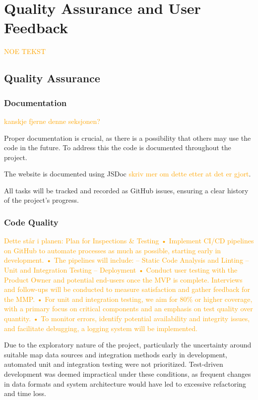 \chapter{Quality Assurance and User Feedback}\label{chap:qualityassuranceanduserfeedback}

\textcolor{orange}{NOE TEKST}

\section{Quality Assurance}

\subsection{Documentation}
\textcolor{orange}{kanskje fjerne denne seksjonen?}

Proper documentation is crucial, as there is a possibility that others may use the code in the
future. To address this the code is documented throughout the project. 

The website is documented using JSDoc \textcolor{orange}{skriv mer om dette etter at det er gjort}.  


All tasks will be tracked and recorded as GitHub issues, ensuring a clear
history of the project's progress. 

\subsection{Code Quality} %

\textcolor{orange}{Dette står i planen: Plan for Inspections & Testing
• Implement CI/CD pipelines on GitHub to automate processes as much as possible, starting
early in development.
• The pipelines will include:
– Static Code Analysis and Linting
– Unit and Integration Testing
– Deployment
• Conduct user testing with the Product Owner and potential end-users once the MVP is
complete. Interviews and follow-ups will be conducted to measure satisfaction and gather
feedback for the MMP.
• For unit and integration testing, we aim for 80\% or higher coverage, with a primary focus on
critical components and an emphasis on test quality over quantity.
• To monitor errors, identify potential availability and integrity issues, and facilitate debugging,
a logging system will be implemented.}

Due to the exploratory nature of the project, particularly the uncertainty around suitable map data sources and integration methods early in development, automated unit and integration testing were not prioritized. Test-driven development was deemed impractical under these conditions, as frequent changes in data formats and system architecture would have led to excessive refactoring and time loss.

